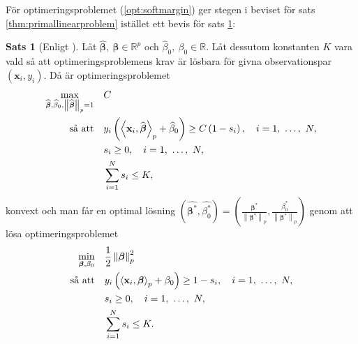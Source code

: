 \documentclass[a4paper, 12pt]{report}
\theoremstyle{definition}
\newtheorem{thm}{Sats}[section]
\newtheorem{cor}[thm]{Korollarium}
\theoremstyle{remark}
\newcommand{\bfbeta}{{\boldsymbol{\beta}}}
\newcommand{\bfx}{\mathbf{x}}
\newcommand{\llangle}{\left\langle}
\newcommand{\rrangle}{\right\rangle}
\newcommand{\inner}[2]{\llangle #1, #2 \rrangle}
\begin{document}
För optimeringsproblemet (\ref{opt:softmargin}) ger stegen i beviset för sats \ref{thm:primallinearproblem} istället ett bevis för sats \ref{thm:primalsoftmargin}:
\begin{thm}[Enligt \cite{ESL}]\label{thm:primalsoftmargin}
	Låt $\widehat{\bfbeta},~\bfbeta \in \mathbb{R}^p$ och $\widehat{\beta}_0,~\beta_0 \in \mathbb{R}$. Låt dessutom konstanten $K$ vara vald så att optimeringsproblemens krav är lösbara för givna observationspar $\left(\mathbf{x}_i, y_i\right)$. Då är optimeringsproblemet
	\begin{equation*}
	\begin{aligned}
	\operatornamewithlimits{max}_{\widehat{\bfbeta}, \widehat{\beta}_0, \left\|\widehat{\bfbeta}
\right\|_p=1} & & &C\\
	\text{så att} & & &y_i\left(\inner{\bfx_i}{\widehat{\bfbeta}}_p+\widehat{\beta}_0\right)\geq C\left(1-s_i\right),\quad i=1,~\dots,~N,\\
	& & &s_i\geq0,\quad i=1,~\dots,~N,\\
	& & &\sum_{i=1}^{N}s_i \leq K,
	\end{aligned}
	\end{equation*}
	konvext och man får en optimal lösning $\left(\widehat{\bfbeta^*},  \widehat{\beta^*_0}\right)=\left(\frac{\bfbeta^*}{\left\|\bfbeta^*\right\|_p}, \frac{\beta^*_0}{\left\|\bfbeta^*\right\|_p}\right)$ genom att lösa optimeringsproblemet
	\begin{equation*}
	\begin{aligned}
	\operatornamewithlimits{min}_{\bfbeta, \beta_0} & & &\frac{1}{2}\left\|\bfbeta
\right\|_p^2\\
	\text{så att} & & &y_i\left(\inner{\bfx_i}{\bfbeta}_p+\beta_0\right)\geq 1 - s_i,\quad i=1,~\dots,~N,\\
	& & &s_i\geq0,\quad i=1,~\dots,~N,\\
	& & &\sum_{i=1}^{N} s_i \leq K.
	\end{aligned}
	\end{equation*}
\end{thm}

\end{document}
